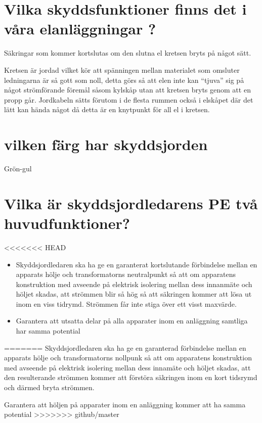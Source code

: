 \documentclass[a4paper,swedish]{article}
\begin{document}
\section{Vilka skyddsfunktioner finns det i våra elanläggningar ?}
\label{sec:q_5}

Säkringar som kommer kortslutas om den slutna el kretsen bryts på något sätt.

Kretsen är jordad vilket kör att spänningen mellan materialet som omsluter ledningarna är så gott som noll,
detta görs så att elen inte kan “tjuva” sig på något strömförande föremål såsom kylskåp utan att kretsen bryts genom
att en propp går. Jordkabeln sätts förutom i de flesta rummen också i elskåpet där det lätt kan hända något då detta är
en knytpunkt för all el i kretsen.

\section{vilken färg har skyddsjorden}
\label{sec:q_7}

Grön-gul

\section{Vilka är skyddsjordledarens PE två huvudfunktioner?}\label{sec:skyddsjordsledarens_funktioner}

<<<<<<< HEAD
\begin{itemize}
\item Skyddsjordledaren ska ha ge en garanterat kortslutande förbindelse mellan en apparats hölje
och transformatorns neutralpunkt så att om apparatens konstruktion
med avseende på elektrisk isolering mellan dess innanmäte och höljet skadas, att strömmen
blir så hög så att säkringen kommer att lösa ut inom en viss tidrymd. Strömmen får inte stiga
över ett visst maxvärde.
\item Garantera att utsatta delar på alla apparater inom en anläggning samtliga har samma potential
\end{itemize}
=======
Skyddsjordledaren ska ha ge en garanterad förbindelse mellan en apparats hölje och transformatorns nollpunk
så att om apparatens konstruktion
med avseende på elektrisk isolering mellan dess innamäte och höljet skadas, att den resulterande strömmen
kommer att förstöra säkringen inom en kort tidsrymd och därmed bryta strömmen.

Garantera att höljen på apparater inom en anläggning kommer att ha samma potential
>>>>>>> github/master
\end{document}
